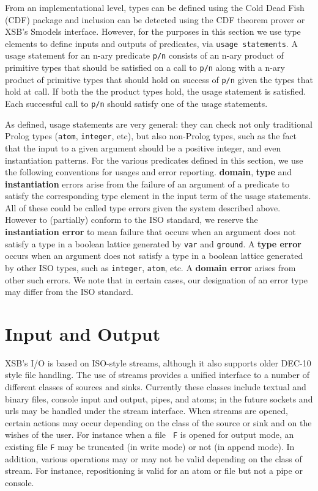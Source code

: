 {From an implementational level, types can be defined using the Cold
Dead Fish (CDF) package and inclusion can be detected using the CDF
theorem prover or XSB's Smodels interface.  However, for the
purposes in this section we use type elements to define inputs and
outputs of predicates, via {\tt usage statements}.  A usage statement
for an n-ary predicate {\tt p/n} consists of an n-ary product of
primitive types that should be satisfied on a call to {\tt p/n} along
with a n-ary product of primitive types that should hold on success of
{\tt p/n} given the types that hold at call.  If both the the product
types hold, the usage statement is satisfied.  Each successful call to
{\tt p/n} should satisfy one of the usage statements.

As defined, usage statements are very general: they can check not only
traditional Prolog types ({\tt atom}, {\tt integer}, etc), but also
non-Prolog types, such as the fact that the input to a given argument
should be a positive integer, and even instantiation patterns.  For
the various predicates defined in this section, we use the following
conventions for usages and error reporting.  {\bf domain}, {\bf type}
and {\bf instantiation} errors arise from the failure of an argument
of a predicate to satisfy the corresponding type element in the input
term of the usage statements.  All of these could be called type
errors given the system described above.  However to (partially)
conform to the ISO standard, we reserve the {\bf instantiation error}
to mean failure that occurs when an argument does not satisfy a type
in a boolean lattice generated by {\tt var} and {\tt ground}.  A {\bf
  type error} occurs when an argument does not satisfy a type in a
boolean lattice generated by other ISO types, such as {\tt integer},
{\tt atom}, etc.  A {\bf domain error} arises from other such errors.
We note that in certain cases, our designation of an error type may
differ from the ISO standard.
}

\section{Input and Output}

XSB's I/O is based on ISO-style streams, although it also supports
older DEC-10 style file handling.  The use of streams provides a
unified interface to a number of different classes of sources and
sinks.  Currently these classes include textual and binary files,
console input and output, pipes, and atoms; in the future sockets and
urls may be handled under the stream interface.  When streams are
opened, certain actions may occur depending on the class of the source
or sink and on the wishes of the user.  For instance when a file {\tt
F} is opened for output mode, an existing file {\tt F} may be
truncated (in write mode) or not (in append mode).  In addition,
various operations may or may not be valid depending on the class of
stream.  For instance, repositioning is valid for an atom or file but
not a pipe or console.

